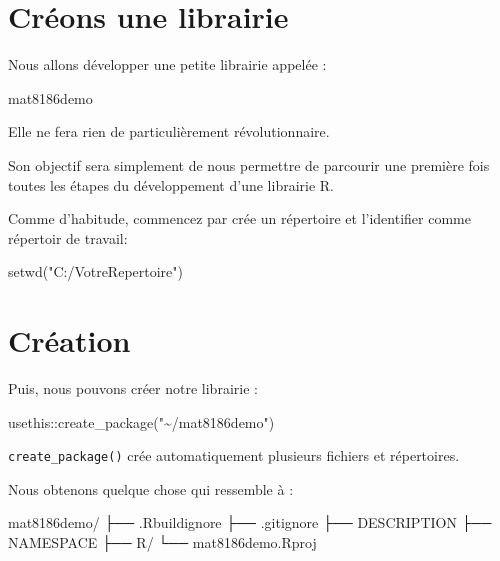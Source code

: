 \documentclass[
  letterpaper,
  DIV=11,
  numbers=noendperiod]{scrreprt}
\newenvironment{Shaded}{\begin{snugshade}}{\end{snugshade}}
\newcommand{\FunctionTok}[1]{\textcolor[rgb]{0.28,0.35,0.67}{#1}}
\newcommand{\NormalTok}[1]{\textcolor[rgb]{0.00,0.23,0.31}{#1}}
\newcommand{\SpecialCharTok}[1]{\textcolor[rgb]{0.37,0.37,0.37}{#1}}
\newcommand{\StringTok}[1]{\textcolor[rgb]{0.13,0.47,0.30}{#1}}
\begin{document}
\section{Créons une librairie}\label{cruxe9ons-une-librairie}

Nous allons développer une petite librairie appelée :

\begin{Shaded}
\begin{Highlighting}[]
\NormalTok{mat8186demo}
\end{Highlighting}
\end{Shaded}

Elle ne fera rien de particulièrement révolutionnaire.

Son objectif sera simplement de nous permettre de parcourir une première
fois toutes les étapes du développement d'une librairie R.

Comme d'habitude, commencez par crée un répertoire et l'identifier comme
répertoir de travail:

\begin{Shaded}
\begin{Highlighting}[]
\FunctionTok{setwd}\NormalTok{(}\StringTok{"C:/VotreRepertoire"}\NormalTok{)}
\end{Highlighting}
\end{Shaded}

\section*{Création}\label{cruxe9ation}


Puis, nous pouvons créer notre librairie :

\begin{Shaded}
\begin{Highlighting}[]
\NormalTok{usethis}\SpecialCharTok{::}\FunctionTok{create\_package}\NormalTok{(}\StringTok{"\textasciitilde{}/mat8186demo"}\NormalTok{)}
\end{Highlighting}
\end{Shaded}

\texttt{create\_package()} crée automatiquement plusieurs fichiers et
répertoires.

Nous obtenons quelque chose qui ressemble à :

\begin{Shaded}
\begin{Highlighting}[]
\NormalTok{mat8186demo/}
\NormalTok{├── .Rbuildignore}
\NormalTok{├── .gitignore}
\NormalTok{├── DESCRIPTION}
\NormalTok{├── NAMESPACE}
\NormalTok{├── R/}
\NormalTok{└── mat8186demo.Rproj}
\end{Highlighting}
\end{Shaded}
\end{document}

